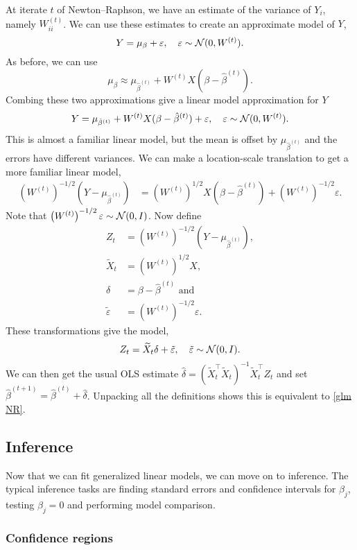 At iterate $t$ of Newton--Raphson, we have an estimate of the variance of $Y_i$, namely $W^{(t)}_{ii}$. We can use these estimates to create an approximate model of $Y$,
\[Y = \mu_\beta + \varepsilon, \quad \varepsilon \sim {\mathcal N}(0, W^{(t)}). \]
As before, we can use
 \[\mu_{\beta} \approx \mu_{\hat{\beta}^{(t)}} + W^{(t)}X(\beta - \hat{\beta}^{(t)}).\] 
Combing these two approximations give a linear model approximation for $Y$
\[Y = \mu_{\hat{\beta}^{(t)}} + W^{(t)}X(\beta - \hat{\beta}^{(t)}) + \varepsilon, \quad \varepsilon \sim {\mathcal N}(0, W^{(t)}).\]
This is almost a familiar linear model, but the mean is offset by $\mu_{\hat{\beta}^{(t)}}$ and the errors have different variances. We can make a location-scale translation to get a more familiar linear model,
\begin{align*}
    \left(W^{(t)}\right)^{-1/2}(Y- \mu_{\hat{\beta}^{(t)}}) &= \left(W^{(t)}\right)^{1/2}X(\beta - \hat{\beta}^{(t)}) + \left(W^{(t)}\right)^{-1/2}\varepsilon.
\end{align*} 
Note that $\left(W^{(t)}\right)^{-1/2}\varepsilon \sim {\mathcal N}(0,I)$. Now define 
\begin{align*}
    Z_t &= \left(W^{(t)}\right)^{-1/2}(Y- \mu_{\hat{\beta}^{(t)}}),\\
     \widetilde{X}_t& = \left(W^{(t)}\right)^{1/2}X,\\
      \delta &= \beta - \hat{\beta}^{(t)} \text{ and }\\
      \tilde{\varepsilon} &= \left(W^{(t)}\right)^{-1/2}\varepsilon.
\end{align*} 
These transformations give the model,
\[Z_t = \widetilde{X}_t \delta + \tilde{\varepsilon}, \quad \tilde{\varepsilon} \sim {\mathcal N}(0,I). \]
We can then get the usual OLS estimate $\hat{\delta} = \left(\widetilde{X}_t^\top\widetilde{X}_t\right)^{-1}\widetilde{X}_t^\top Z_t$ and set $\hat{\beta}^{(t+1)}=\hat{\beta}^{(t)}+\hat{\delta}$. Unpacking all the definitions shows this is equivalent to \eqref{glm NR}.

\subsection{Inference}

Now that we can fit generalized linear models, we can move on to inference. The typical inference tasks are finding standard errors and confidence intervals for $\beta_j$,  testing $\beta_j = 0$ and performing model comparison.

\subsubsection*{Confidence regions}

